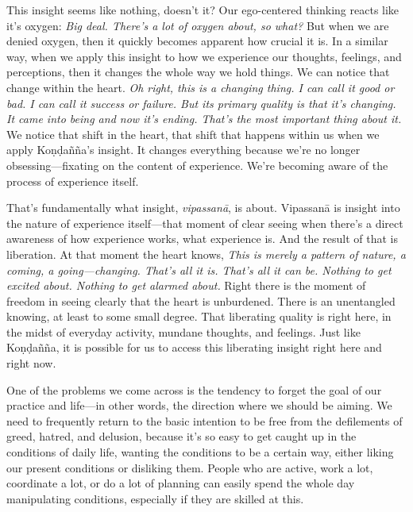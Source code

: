 This insight seems like nothing, doesn't it? Our ego-centered thinking 
reacts like it's oxygen: \emph{Big deal. There's a lot of oxygen about, 
so what?} But when we are denied oxygen, then it quickly becomes 
apparent how crucial it is. In a similar way, when we apply this 
insight to how we experience our thoughts, feelings, and perceptions, 
then it changes the whole way we hold things. We can notice that change 
within the heart. \emph{Oh right, this is a changing thing. I can call 
it good or bad. I can call it success or failure. But its primary 
quality is that it's changing. It came into being and now it's ending. 
That's the most important thing about it.} We notice that shift in the 
heart, that shift that happens within us when we apply Koṇḍañña's 
insight. It changes everything because we're no longer 
obsessing---fixating on the content of experience. We're becoming aware 
of the process of experience itself.

That's fundamentally what insight, \emph{vipassanā}, is about. 
Vipassanā is insight into the nature of experience itself---that 
moment of clear seeing when there's a direct awareness of how 
experience works, what experience is. And the result of that is 
liberation. At that moment the heart knows, \emph{This is merely a 
pattern of nature, a coming, a going---changing. That's all it is. 
That's all it can be. Nothing to get excited about. Nothing to get 
alarmed about.} Right there is the moment of freedom in seeing clearly 
that the heart is unburdened. There is an unentangled knowing, at least 
to some small degree. That liberating quality is right here, in the 
midst of everyday activity, mundane thoughts, and feelings. Just like 
Koṇḍañña, it is possible for us to access this liberating insight 
right here and right now.


One of the problems we come across is the tendency to forget the goal 
of our practice and life---in other words, the direction where we 
should be aiming. We need to frequently return to the basic intention 
to be free from the defilements of greed, hatred, and delusion, because 
it's so easy to get caught up in the conditions of daily life, wanting 
the conditions to be a certain way, either liking our present 
conditions or disliking them. People who are active, work a lot, 
coordinate a lot, or do a lot of planning can easily spend the whole 
day manipulating conditions, especially if they are skilled at this.

